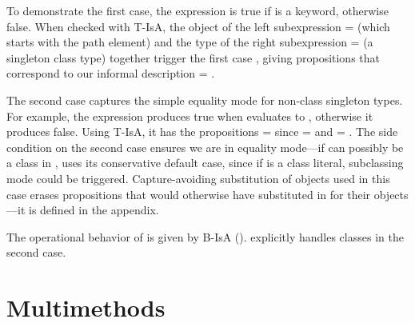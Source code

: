 To demonstrate the first \isacompareliteral{} case,
the expression
\isaapp{\appexp{\classconst{}}{\x{}}}{\Keyword}
is true if \x{} is a keyword, otherwise false.
When checked with T-IsA,
the object of the left subexpression \object{} = {\pth{\classpe{}}{\x{}}}
(which starts with the {\classpe{}} path element)
and the type of the right subexpression \ty{} = {\Value{\Keyword}} (a singleton class type)
together trigger the first \isacompareliteral{} case
\isacompare{\s{}}{\pth{\classpe{}}{\x{}}}{\Value{\Keyword}}{\filterset{\isprop{\Keyword}{\x{}}}{\notprop{\Keyword}{\x{}}}},
giving propositions that correspond to our informal description {\filterset{\thenprop{\prop{}}}{\elseprop{\prop{}}}} = {\filterset{\isprop{\Keyword}{\x{}}}{\notprop{\Keyword}{\x{}}}}.

The second \isacompareliteral{} case captures the simple equality mode for non-class singleton types.
For example,
the expression
 produces true 
when \x{} evaluates to {}, otherwise it produces false.
Using T-IsA,
it has the propositions {\filterset{\thenprop{\prop{}}}{\elseprop{\prop{}}}} = 
since \object{} = {\x{}} and \ty{} = {}.
%
The side condition on the second \isacompareliteral{} case ensures we are in equality mode---if \x{} can possibly be a class in 
\isaapp{\x{}}{\Object{}}, \isacompareliteral{} uses its conservative default case,
since if \x{} is a class literal, subclassing mode could be triggered.
%
Capture-avoiding substitution of objects {\replacefor {} {\object{}} {\x{}}} used in this case erases propositions
that would otherwise have \emptyobject{} substituted in for their objects---it
is defined in the appendix.

The operational behavior of \isaliteral{} is given by B-IsA (). \isaopsemliteral{} explicitly handles classes in the second case.



\section{Multimethods}

